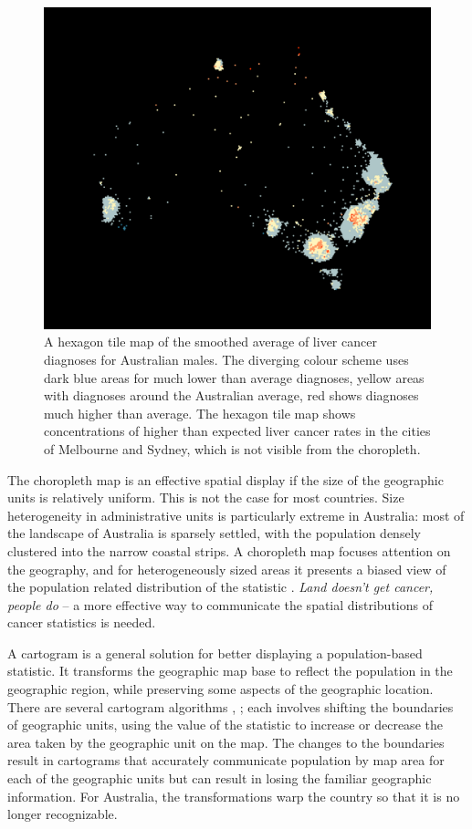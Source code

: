 \documentclass{monashthesis}
\begin{document}
\begin{figure}[H]
\centering
\includegraphics[width=16cm]{figures/04-experiment/aus_liver_m_hex.pdf}
\caption{\label{fig:liver-hex}A hexagon tile map of the smoothed average of liver cancer diagnoses for Australian males. The diverging colour scheme uses dark blue areas for much lower than average diagnoses, yellow areas with diagnoses around the Australian average, red shows diagnoses much higher than average. The hexagon tile map shows concentrations of higher than expected liver cancer rates in the cities of Melbourne and Sydney, which is not visible from the choropleth.}
\end{figure}

The choropleth map is an effective spatial display if the size of the geographic units is relatively uniform. This is not the case for most countries. Size heterogeneity in administrative units is particularly extreme in Australia: most of the landscape of Australia is sparsely settled, with the population densely clustered into the narrow coastal strips. A choropleth map focuses attention on the geography, and for heterogeneously sized areas it presents a biased view of the population related distribution of the statistic \autocite{CBATCC}. \emph{Land doesn't get cancer, people do} -- a more effective way to communicate the spatial distributions of cancer statistics is needed.

A cartogram is a general solution for better displaying a population-based statistic. It transforms the geographic map base to reflect the population in the geographic region, while preserving some aspects of the geographic location. There are several cartogram algorithms \autocite{ACTUC}, \autocite{CBATCC}; each involves shifting the boundaries of geographic units, using the value of the statistic to increase or decrease the area taken by the geographic unit on the map. The changes to the boundaries result in cartograms that accurately communicate population by map area for each of the geographic units but can result in losing the familiar geographic information. For Australia, the transformations warp the country so that it is no longer recognizable.
\end{document}
